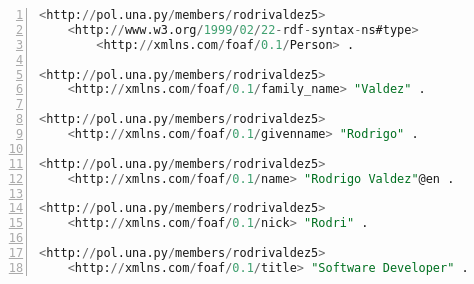 \noindent\begin{minipage}{\textwidth}
\begin{lstlisting}[captionpos=b, caption=Ejemplo en RDF/N-Quads, label=lst:ValdezRDF,  numbers=left, language=SQL, numberstyle=\tiny\color{mygray},frame=single]
<http://pol.una.py/members/rodrivaldez5>
    <http://www.w3.org/1999/02/22-rdf-syntax-ns#type>
        <http://xmlns.com/foaf/0.1/Person> .
        
<http://pol.una.py/members/rodrivaldez5>
    <http://xmlns.com/foaf/0.1/family_name> "Valdez" .
    
<http://pol.una.py/members/rodrivaldez5>
    <http://xmlns.com/foaf/0.1/givenname> "Rodrigo" .
    
<http://pol.una.py/members/rodrivaldez5>
    <http://xmlns.com/foaf/0.1/name> "Rodrigo Valdez"@en .
    
<http://pol.una.py/members/rodrivaldez5>
    <http://xmlns.com/foaf/0.1/nick> "Rodri" .
    
<http://pol.una.py/members/rodrivaldez5>
    <http://xmlns.com/foaf/0.1/title> "Software Developer" .
\end{lstlisting}
\end{minipage}







